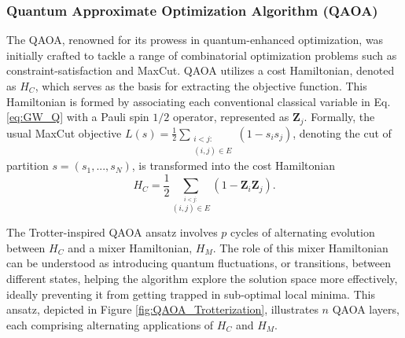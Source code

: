 
\subsubsection{Quantum Approximate Optimization Algorithm (QAOA)}
\label{sec: QAOA}

The QAOA, renowned for its prowess in quantum-enhanced optimization, was initially crafted to tackle a range of combinatorial optimization problems such as constraint-satisfaction and MaxCut. QAOA utilizes a cost Hamiltonian, denoted as \(H_C\), which serves as the basis for extracting the objective function. This Hamiltonian is formed by associating each conventional classical variable in Eq. \ref{eq:GW_Q} with a Pauli spin \(1/2\) operator, represented as \(\boldsymbol{Z}_j\). Formally, the usual MaxCut objective $L(s) = \frac{1}{2}\sum_{\substack{i < j: \\ (i,j)\in E}}(1-s_{i}s_{j})$, denoting the cut of partition $s = (s_1,...,s_N)$, is transformed into the cost Hamiltonian
\begin{equation}\label{eq:H_C}
  H_C = \frac{1}{2}\sum_{\stackrel{i < j:}{(i,j)\in E}}(1-\boldsymbol{Z}_i\boldsymbol{Z}_j).
\end{equation}

The Trotter-inspired QAOA ansatz involves $p$ cycles of alternating evolution between $H_C$ and a mixer Hamiltonian, $H_M$. The role of this mixer Hamiltonian can be understood as introducing quantum fluctuations, or transitions, between different states, helping the algorithm explore the solution space more effectively, ideally preventing it from getting trapped in sub-optimal local minima. This ansatz, depicted in Figure \ref{fig:QAOA_Trotterization}, illustrates $n$ QAOA layers, each comprising alternating applications of $H_C$ and $H_M$. 

